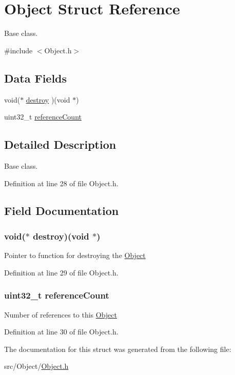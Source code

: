 \hypertarget{struct_object}{
\section{Object Struct Reference}
\label{struct_object}
}


Base class.  




{\ttfamily \#include $<$Object.h$>$}

\subsection*{Data Fields}
\begin{DoxyCompactItemize}
\item 
void($\ast$ \hyperlink{struct_object_aa353725933e843001d4feb03f8268121}{destroy} )(void $\ast$)
\item 
uint32\_\-t \hyperlink{struct_object_ad83c3d5d3f46e6278a77cb80eb2a0705}{referenceCount}
\end{DoxyCompactItemize}


\subsection{Detailed Description}
Base class. 

Definition at line 28 of file Object.h.



\subsection{Field Documentation}
\hypertarget{struct_object_aa353725933e843001d4feb03f8268121}{
\subsubsection[{destroy}]{\setlength{\rightskip}{0pt plus 5cm}void($\ast$ {\bf destroy})(void $\ast$)}}
\label{struct_object_aa353725933e843001d4feb03f8268121}
Pointer to function for destroying the \hyperlink{struct_object}{Object} 

Definition at line 29 of file Object.h.

\hypertarget{struct_object_ad83c3d5d3f46e6278a77cb80eb2a0705}{
\subsubsection[{referenceCount}]{\setlength{\rightskip}{0pt plus 5cm}uint32\_\-t {\bf referenceCount}}}
\label{struct_object_ad83c3d5d3f46e6278a77cb80eb2a0705}
Number of references to this \hyperlink{struct_object}{Object} 

Definition at line 30 of file Object.h.



The documentation for this struct was generated from the following file:\begin{DoxyCompactItemize}
\item 
src/Object/\hyperlink{_object_8h}{Object.h}\end{DoxyCompactItemize}
